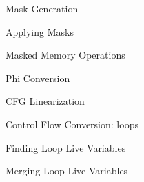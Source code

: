 
\begin{frame}{Mask Generation}

\end{frame}


\begin{frame}{Applying Masks}

\end{frame}


\begin{frame}{Masked Memory Operations}

\end{frame}


\begin{frame}{Phi Conversion}

\end{frame}


\begin{frame}{CFG Linearization}

\end{frame}


\begin{frame}{Control Flow Conversion: loops}

\end{frame}


\begin{frame}{Finding Loop Live Variables}

\end{frame}


\begin{frame}{Merging Loop Live Variables}

\end{frame}
